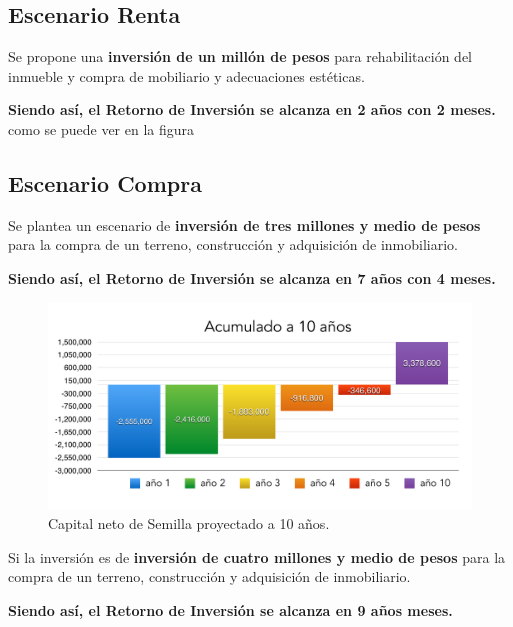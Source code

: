 \documentclass[10pt,letterpaper,oneside]{book}
\begin{document}
\subsection{Escenario Renta}
Se propone una {\bf inversión de un millón de pesos} para rehabilitación del inmueble y compra de mobiliario y adecuaciones estéticas.

\vspace{0.2cm}
{\bf\large \color{red} Siendo así, el Retorno de Inversión se alcanza en 2 años con 2 meses.} como se puede ver en la figura 



\subsection{Escenario Compra}
Se plantea un escenario de {\bf inversión de tres millones y medio de pesos} para la compra de un terreno, construcción y adquisición de inmobiliario.

\vspace{0.2cm}
{\bf\large \color{red} Siendo así, el Retorno de Inversión se alcanza en 7 años con 4 meses.}

\begin{figure}[h]
\begin{center}
\includegraphics[scale=0.4]{10anos2.pdf}
\caption{Capital neto de Semilla proyectado a 10 años.}
\label{Proyeccion10.1}
\end{center}
\end{figure}

Si la inversión es de {\bf inversión de cuatro millones y medio de pesos} para la compra de un terreno, construcción y adquisición de inmobiliario.

\vspace{0.2cm}
{\bf\large \color{red} Siendo así, el Retorno de Inversión se alcanza en 9 años meses.}
\end{document}

